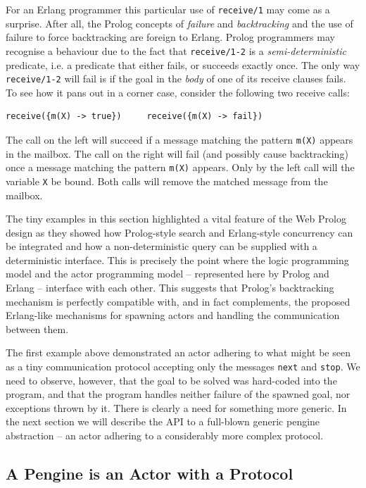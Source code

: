 \documentclass{tlp}
\begin{document}
For an Erlang programmer this particular use of \texttt{receive/1} may come as a surprise. After all, the Prolog concepts of \textit{failure} and \textit{backtracking} and the use of failure to force backtracking are foreign to Erlang. Prolog programmers may recognise a behaviour due to the fact that \texttt{receive/1-2} is a \textit{semi-deterministic} predicate, i.e. a predicate that either fails, or succeeds exactly once. The only way \texttt{receive/1-2} will fail is if the goal in the \textit{body} of one of its receive clauses fails. To see how it pans out in a corner case, consider the following two receive calls:

\begin{lstlisting}
receive({m(X) -> true})     receive({m(X) -> fail})
\end{lstlisting} 

\noindent The call on the left will succeed if a message matching the pattern \texttt{m(X)} appears in the mailbox. The call on the right will fail (and possibly cause backtracking) once a message matching the pattern \texttt{m(X)} appears. Only by the left call will the variable \texttt{X} be bound. Both calls will remove the matched message from the mailbox.

The tiny examples in this section highlighted a vital feature of the Web Prolog design as they showed how Prolog-style search and Erlang-style concurrency can be integrated and how a non-deterministic query can be supplied with a deterministic interface. This is precisely the point where the logic programming model and the actor programming model -- represented here by Prolog and Erlang -- interface with each other. This suggests that Prolog's backtracking mechanism is perfectly compatible with, and in fact complements, the proposed Erlang-like mechanisms for spawning actors and handling the communication between them.

The first example above demonstrated an actor adhering to what might be seen as a tiny communication protocol accepting only the messages \texttt{next} and \texttt{stop}. We need to observe, however, that the goal to be solved was hard-coded into the program, and that the program handles neither failure of the spawned goal, nor exceptions thrown by it. There is clearly a need for something more generic. In the next section we will describe the API to a full-blown generic pengine abstraction -- an actor adhering to a considerably more complex protocol.


\subsection{A Pengine is an Actor with a Protocol}
\end{document}
